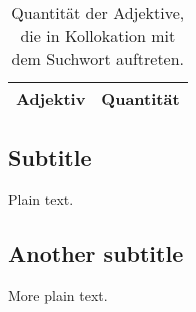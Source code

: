 \begin{table}[htpb]\label{t}
	\center
	\begin{tabularx}{0.35\textwidth}{lr}
		\toprule
		\textbf{Adjektiv} & \textbf{Quantität}\\
		\midrule
		
		\bottomrule
	\end{tabularx}
	\caption{Quantität der Adjektive, die in Kollokation mit dem Suchwort
	auftreten.}
	\label{tab:undefined}
\end{table}

\subsection{Subtitle}

Plain text.

\subsection{Another subtitle}

More plain text.



